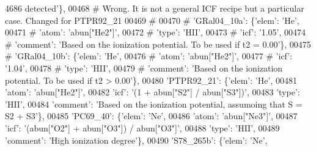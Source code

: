\begin{DoxyCode}
{       4686 detected'}\},
00468 \textcolor{comment}{# Wrong. It is not a general ICF recipe but a particular case. Changed for PTPR92\_21}
00469 \textcolor{comment}{#}
00470 \textcolor{comment}{#                         'GRal04\_10a': \{'elem': 'He',}
00471 \textcolor{comment}{#                                      'atom': 'abun["He2"]',}
00472 \textcolor{comment}{#                                      'type': 'HII',}
00473 \textcolor{comment}{#                                      'icf': '1.05',}
00474 \textcolor{comment}{#                                      'comment': 'Based on the ionization potential. To be used if t2 =
       0.00'\},}
00475 \textcolor{comment}{#                         'GRal04\_10b': \{'elem': 'He',}
00476 \textcolor{comment}{#                                      'atom': 'abun["He2"]',}
00477 \textcolor{comment}{#                                      'icf': '1.04',}
00478 \textcolor{comment}{#                                      'type': 'HII',}
00479 \textcolor{comment}{#                                      'comment': 'Based on the ionization potential. To be used if t2 >
       0.00'\},}
00480                          \textcolor{stringliteral}{'PTPR92\_21'}: \{\textcolor{stringliteral}{'elem'}: \textcolor{stringliteral}{'He'},
00481                                       \textcolor{stringliteral}{'atom'}: \textcolor{stringliteral}{'abun["He2"]'},
00482                                       \textcolor{stringliteral}{'icf'}: \textcolor{stringliteral}{'(1 + abun["S2"] / abun["S3"])'},
00483                                       \textcolor{stringliteral}{'type'}: \textcolor{stringliteral}{'HII'},
00484                                       \textcolor{stringliteral}{'comment'}: \textcolor{stringliteral}{'Based on the ionization potential, assumoing that S = S2
       + S3'}\},
00485                          \textcolor{stringliteral}{'PC69\_40'}: \{\textcolor{stringliteral}{'elem'}: \textcolor{stringliteral}{'Ne'},
00486                                     \textcolor{stringliteral}{'atom'}: \textcolor{stringliteral}{'abun["Ne3"]'},
00487                                    \textcolor{stringliteral}{'icf'}: \textcolor{stringliteral}{'(abun["O2"] + abun["O3"]) / abun["O3"]'},
00488                                    \textcolor{stringliteral}{'type'}: \textcolor{stringliteral}{'HII'},
00489                                    \textcolor{stringliteral}{'comment'}: \textcolor{stringliteral}{'High ionization degree'}\},
00490                          \textcolor{stringliteral}{'S78\_265b'}: \{\textcolor{stringliteral}{'elem'}: \textcolor{stringliteral}{'Ne'},

\end{DoxyCode}
